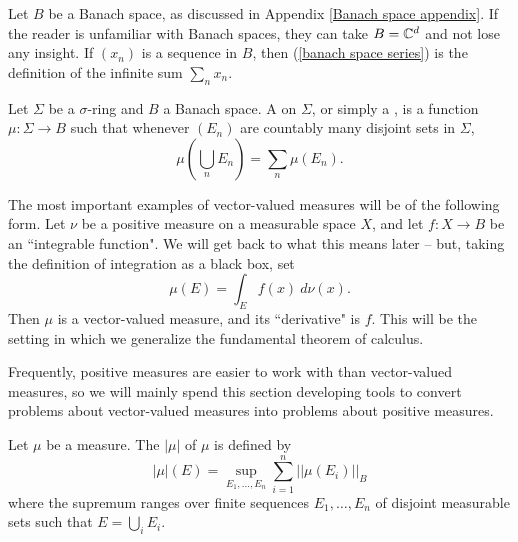 \begin{subsec}
Let $B$ be a Banach space, as discussed in Appendix \ref{Banach space appendix}.
If the reader is unfamiliar with Banach spaces, they can take $B = \mathbb{C}^d$ and not lose any insight.
If $(x_n)$ is a sequence in $B$, then (\ref{banach space series}) is the definition of the infinite sum $\sum_n x_n$.
\end{subsec}

\begin{definition}
Let $\Sigma$ be a $\sigma$-ring and $B$ a Banach space.
A  on $\Sigma$, or simply a , is a function $\mu: \Sigma \to B$ such that whenever $(E_n)$ are countably many disjoint sets in $\Sigma$,
$$\mu\left(\bigcup_n E_n\right) = \sum_n \mu(E_n).$$
\end{definition}

\begin{example}
The most important examples of vector-valued measures will be of the following form.
Let $\nu$ be a positive measure on a measurable space $X$, and let $f: X \to B$ be an ``integrable function".
We will get back to what this means later -- but, taking the definition of integration as a black box, set
$$\mu(E) = \int_E f(x) ~d\nu(x).$$
Then $\mu$ is a vector-valued measure, and its ``derivative" is $f$.
This will be the setting in which we generalize the fundamental theorem of calculus.
\end{example}

\begin{subsec}
Frequently, positive measures are easier to work with than vector-valued measures, so we will mainly spend this section developing tools to convert problems about vector-valued measures into problems about positive measures.
\end{subsec}

\begin{definition}
Let $\mu$ be a measure. The  $|\mu|$ of $\mu$ is defined by
$$|\mu|(E) = \sup_{E_1, \dots, E_n} \sum_{i=1}^n ||\mu(E_i)||_B$$
where the supremum ranges over finite sequences $E_1, \dots, E_n$ of disjoint measurable sets such that $E = \bigcup_i E_i$.
\end{definition}

